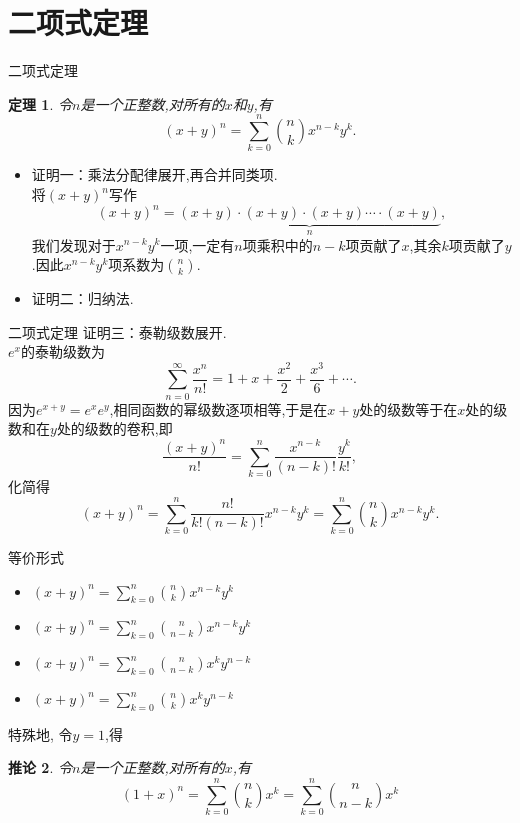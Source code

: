 \documentclass[punct]{ctexbeamer}
\newtheorem{thm}{定理}[section]
\newtheorem{cor}[thm]{推论}
\begin{document}
\section{二项式定理}
\begin{frame}{二项式定理}
	\begin{thm}
		令$n$是一个正整数,对所有的$x$和$y$,有
		$$(x+y)^{n}=\sum _{k=0}^n  \binom{n}{k} x^{n-k}y^k.$$
	\end{thm}

	\begin{itemize}

		\item 证明一：乘法分配律展开,再合并同类项.\\
将$(x+y)^n$写作$$(x+y)^n=\underbrace{(x+y) \cdot(x+y) \cdot(x+y) \cdots \cdot(x+y)}_n,$$
我们发现对于$x^{n-k}y^k$一项,一定有$n$项乘积中的$n-k$项贡献了$x$,其余$k$项贡献了$y$.因此$x^{n-k}y^k$项系数为$\binom{n}{k}$.
		\item 证明二：归纳法.


	\end{itemize}

\end{frame}
\begin{frame}{二项式定理}
	 证明三：泰勒级数展开.\\
	$e^x$的泰勒级数为$$\sum_{n=0}^{\infty}\frac{x^n}{n!}=1+x+\frac{x^2}{2}+\frac{x^3}{6}+\cdots.$$
	因为$e^{x+y}=e^x e^y$,相同函数的幂级数逐项相等,于是在$x+y$处的级数等于在$x$处的级数和在$y$处的级数的卷积,即
	$$\frac{(x+y)^n}{n!}=\sum_{k=0}^{n}\frac{x^{n-k}}{(n-k)!}\frac{y^k}{k!},$$化简得$$(x+y)^{n}=\sum_{k=0}^{n}\frac{n!}{k!(n-k)!}x^{n-k}y^k=\sum _{k=0}^n  \binom{n}{k} x^{n-k}y^k.$$

\end{frame}

\begin{frame}{等价形式}
\begin{itemize}
    \item $(x+y)^{n}=\sum\limits_{k=0}^n  \binom{n}{k} x^{n-k} y^k$
	\item $(x+y)^{n}=\sum\limits_{k=0}^n  \binom{n}{n-k} x^{n-k} y^k$

	\item $(x+y)^{n}=\sum\limits_{k=0}^n  \binom{n}{n-k} x^k y^{n-k}$

	\item $(x+y)^{n}=\sum\limits_{k=0}^n  \binom{n}{k} x^k y^{n-k}$
\end{itemize}
	特殊地, 令$y=1$,得
\begin{cor}
令$n$是一个正整数,对所有的$x$,有
$$(1+x)^{n}=\sum _{k=0}^n  \binom{n}{k} x^k=\sum _{k=0}^n  \binom{n}{n-k} x^k$$
\end{cor}

\end{frame}
\end{document}
